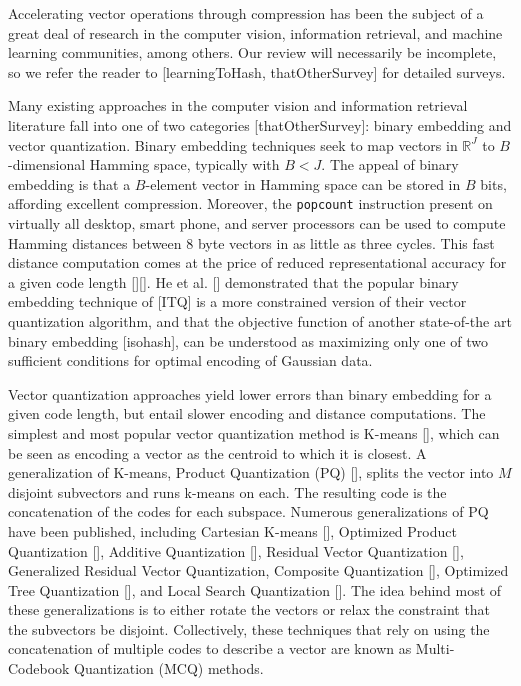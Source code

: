 
Accelerating vector operations through compression has been the subject of a great deal of research in the computer vision, information retrieval, and machine learning communities, among others. Our review will necessarily be incomplete, so we refer the reader to [learningToHash, thatOtherSurvey] for detailed surveys. %

Many existing approaches in the computer vision and information retrieval literature fall into one of two categories [thatOtherSurvey]: binary embedding and vector quantization. Binary embedding techniques seek to map vectors in $\mathbb{R}^J$ to $B$-dimensional Hamming space, typically with $B < J$. The appeal of binary embedding is that a $B$-element vector in Hamming space can be stored in $B$ bits, affording excellent compression. Moreover, the \texttt{popcount} instruction present on virtually all desktop, smart phone, and server processors can be used to compute Hamming distances between 8 byte vectors in as little as three cycles. This fast distance computation comes at the price of reduced representational accuracy for a given code length [][]. He et al. [] demonstrated that the popular binary embedding technique of [ITQ] is a more constrained version of their vector quantization algorithm, and that the objective function of another state-of-the art binary embedding [isohash], can be understood as maximizing only one of two sufficient conditions for optimal encoding of Gaussian data.

Vector quantization approaches yield lower errors than binary embedding for a given code length, but entail slower encoding and distance computations. The simplest and most popular vector quantization method is K-means [], which can be seen as encoding a vector as the centroid to which it is closest. A generalization of K-means, Product Quantization (PQ) [], splits the vector into $M$ disjoint subvectors and runs k-means on each. The resulting code is the concatenation of the codes for each subspace. Numerous generalizations of PQ have been published, including Cartesian K-means [], Optimized Product Quantization [], Additive Quantization [], Residual Vector Quantization [], Generalized Residual Vector Quantization, Composite Quantization [], Optimized Tree Quantization [], and Local Search Quantization []. The idea behind most of these generalizations is to either rotate the vectors or relax the constraint that the subvectors be disjoint. Collectively, these techniques that rely on using the concatenation of multiple codes to describe a vector are known as Multi-Codebook Quantization (MCQ) methods.

